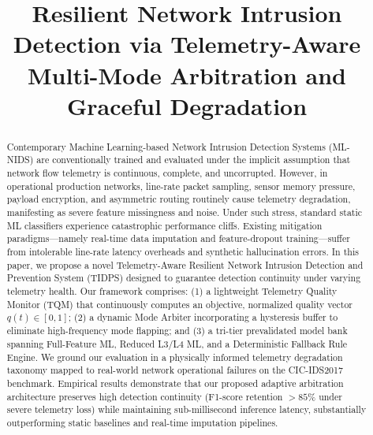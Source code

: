 \documentclass[conference]{IEEEtran}
\begin{document}
\title{Resilient Network Intrusion Detection via Telemetry-Aware Multi-Mode Arbitration and Graceful Degradation}

\author{
}

\maketitle

\begin{abstract}
Contemporary Machine Learning-based Network Intrusion Detection Systems (ML-NIDS) are conventionally trained and evaluated under the implicit assumption that network flow telemetry is continuous, complete, and uncorrupted. However, in operational production networks, line-rate packet sampling, sensor memory pressure, payload encryption, and asymmetric routing routinely cause telemetry degradation, manifesting as severe feature missingness and noise. Under such stress, standard static ML classifiers experience catastrophic performance cliffs. Existing mitigation paradigms—namely real-time data imputation and feature-dropout training—suffer from intolerable line-rate latency overheads and synthetic hallucination errors. In this paper, we propose a novel Telemetry-Aware Resilient Network Intrusion Detection and Prevention System (TIDPS) designed to guarantee detection continuity under varying telemetry health. Our framework comprises: (1) a lightweight Telemetry Quality Monitor (TQM) that continuously computes an objective, normalized quality vector $q(t) \in [0, 1]$; (2) a dynamic Mode Arbiter incorporating a hysteresis buffer to eliminate high-frequency mode flapping; and (3) a tri-tier prevalidated model bank spanning Full-Feature ML, Reduced L3/L4 ML, and a Deterministic Fallback Rule Engine. We ground our evaluation in a physically informed telemetry degradation taxonomy mapped to real-world network operational failures on the CIC-IDS2017 benchmark. Empirical results demonstrate that our proposed adaptive arbitration architecture preserves high detection continuity (F1-score retention $>85\%$ under severe telemetry loss) while maintaining sub-millisecond inference latency, substantially outperforming static baselines and real-time imputation pipelines.
\end{abstract}
\end{document}
